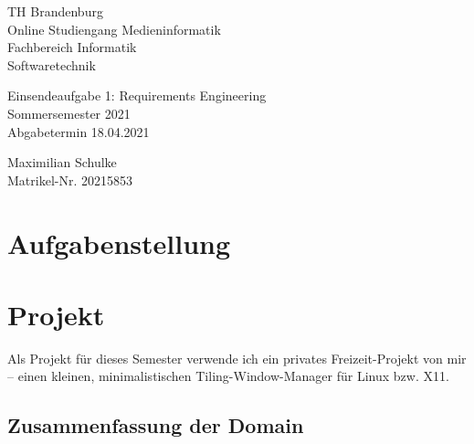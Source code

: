 \documentclass{article}
\begin{document}
\begin{titlepage}
	\begin{flushleft}
		TH Brandenburg \\
		Online Studiengang Medieninformatik \\
		Fachbereich Informatik \\
		Softwaretechnik
	\end{flushleft}

	\vfill

	\begin{center}
		\Large{Einsendeaufgabe 1: Requirements Engineering}\\[0.5em]
		\large{Sommersemester 2021}\\[0.25em]
		\large{Abgabetermin 18.04.2021}
	\end{center}

	\vfill

	\begin{flushright}
		Maximilian Schulke \\
		Matrikel-Nr. 20215853
	\end{flushright}
\end{titlepage}

\tableofcontents

\newpage

\section{Aufgabenstellung}



\section{Projekt}

Als Projekt für dieses Semester verwende ich ein privates Freizeit-Projekt von mir – einen kleinen,
minimalistischen Tiling-Window-Manager für Linux bzw. X11.

\subsection{Zusammenfassung der Domain}
\end{document}
